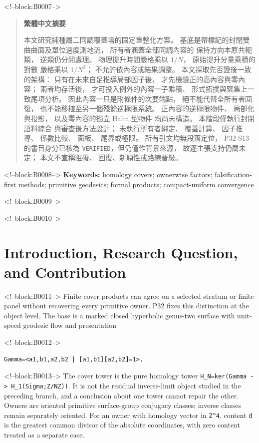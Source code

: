 \documentclass[11pt]{article}
\newenvironment{zhabstract}
  {\begin{quotation}\cjkfont\small\raggedright\noindent\textbf{繁體中文摘要}\par\smallskip\mdseries}
  {\end{quotation}}
\begin{document}
<!--block:B0007-->
\begin{zhabstract}
本文研究純種屬二同調覆蓋塔的固定重整化方案。 基底是帶標記的封閉雙曲曲面及單位速度測地流， 所有者涵蓋全部同調內容的 保持方向本原共軛類， 逆類仍分開處理。 物理提升時間嚴格乘以 $1/N$， 原始提升分量乘積的對數 嚴格乘以 $1/N^3$； 不允許依內容或結果調整。 本文採取先否證後一致的架構： 只有在未來自足推導局部因子後， 才先檢驗正的高內容與零內容； 兩者均存活後， 才可投入例外的內容一子乘積、 形式拓撲與緊集上一致尾項分析。 因此內容一只是附條件的次要端點， 絕不能代替全所有者回復， 也不能移植至另一個殘餘逆極限系統。 正內容的逆極限物件、 局部化與投影， 以及零內容的獨立 Hahn 型物件 均尚未構造。 本階段僅執行封閉語料綜合 與審查後方法設計； 未執行所有者綁定、 覆蓋計算、 因子推導、 係數比較、 面板、 尾界或極限。 所有引文均無段落定位， P32-S13 的書目身分已核為 \texttt{VERIFIED}，但仍僅作背景來源， 故逐主張支持仍屬未定； 本文不宣稱阻礙、 回復、新穎性或路線晉級。
\end{zhabstract}

<!--block:B0008-->
\noindent\textbf{Keywords:} homology covers; ownerwise factors;
falsification-first methods; primitive geodesics; formal products;
compact-uniform convergence

<!--block:B0009-->
\medskip
{}

<!--block:B0010-->
\hypertarget{1-introduction-research-question-and-contribution}{%
\section{Introduction, Research Question, and
Contribution}\label{1-introduction-research-question-and-contribution}}

<!--block:B0011-->
Finite-cover products can agree on a selected stratum or finite panel
without recovering every primitive owner. P32 fixes this distinction at
the object level. The base is a marked closed hyperbolic genus-two
surface with unit-speed geodesic flow and presentation

<!--block:B0012-->
\begin{verbatim}
Gamma=<a1,b1,a2,b2 | [a1,b1][a2,b2]=1>.
\end{verbatim}

<!--block:B0013-->
The cover tower is the pure homology tower
\texttt{H\_N=ker(Gamma\ -\textgreater{}\ H\_1(Sigma;Z/NZ))}. It is not
the residual inverse-limit object studied in the preceding branch, and a
conclusion about one tower cannot repair the other. Owners are oriented
primitive surface-group conjugacy classes; inverse classes remain
separately oriented. For an owner with homology vector in
\texttt{Z\^{}4}, content \texttt{d} is the greatest common divisor of
the absolute coordinates, with zero content treated as a separate case.
\end{document}
